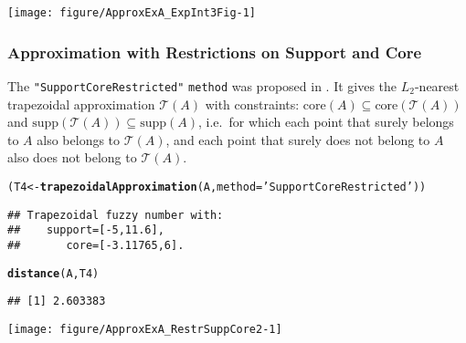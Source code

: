 \documentclass[11pt]{article}\usepackage[]{graphicx}\usepackage[]{color}
\makeatletter
\newcommand{\hlstr}[1]{\textcolor[rgb]{0.192,0.494,0.8}{#1}}%
\newcommand{\hlstd}[1]{\textcolor[rgb]{0.345,0.345,0.345}{#1}}%
\newcommand{\hlkwb}[1]{\textcolor[rgb]{0.69,0.353,0.396}{#1}}%
\newcommand{\hlkwc}[1]{\textcolor[rgb]{0.333,0.667,0.333}{#1}}%
\newcommand{\hlkwd}[1]{\textcolor[rgb]{0.737,0.353,0.396}{\textbf{#1}}}%
\newenvironment{kframe}{%
 \def\at@end@of@kframe{}%
 \ifinner\ifhmode%
  \def\at@end@of@kframe{\end{minipage}}%
  \begin{minipage}{\columnwidth}%
 \fi\fi%
 \def\FrameCommand##1{\hskip\@totalleftmargin \hskip-\fboxsep
 \colorbox{shadecolor}{##1}\hskip-\fboxsep
     \hskip-\linewidth \hskip-\@totalleftmargin \hskip\columnwidth}%
 \MakeFramed {\advance\hsize-\width
   \@totalleftmargin\z@ \linewidth\hsize
   \@setminipage}}%
 {\par\unskip\endMakeFramed%
 \at@end@of@kframe}
\newenvironment{knitrout}{}{} %
\newcommand{\argument}[1]{\texttt{\hlkwc{#1}}}
\newcommand{\str}[1]{\texttt{\hlstr{#1}}}
\makeatother
\begin{document}
\begin{center}
\begin{knitrout}\small
{}\color{fgcolor}

{\centering \texttt{[image: figure/ApproxExA\_ExpInt3Fig-1]} 

}



\end{knitrout}
\end{center}


\subsubsection{Approximation with Restrictions on Support and Core}


The \str{"{}SupportCoreRestricted"{}} \argument{method}
was proposed in \cite{GrzegorzewskiPasternak2011:trapapproxsupcore}.
It gives the $L_2$-nearest trapezoidal approximation $\mathcal{T}(A)$
with constraints:
$\mathrm{core}(A) \subseteq \mathrm{core}(\mathcal{T}(A))$
and $\mathrm{supp}(\mathcal{T}(A)) \subseteq \mathrm{supp}(A)$,
i.e.~for which each point that surely belongs to $A$ also belongs to $\mathcal{T}(A)$,
and each point that surely does not belong to $A$ also does not belong to $\mathcal{T}(A)$.

\begin{knitrout}\small
{}\color{fgcolor}\begin{kframe}
\begin{alltt}
\hlstd{(T4} \hlkwb{<-} \hlkwd{trapezoidalApproximation}\hlstd{(A,} \hlkwc{method}\hlstd{=}\hlstr{'SupportCoreRestricted'}\hlstd{))}
\end{alltt}
\begin{verbatim}
## Trapezoidal fuzzy number with:
##    support=[-5,11.6],
##       core=[-3.11765,6].
\end{verbatim}
\begin{alltt}
\hlkwd{distance}\hlstd{(A, T4)}
\end{alltt}
\begin{verbatim}
## [1] 2.603383
\end{verbatim}
\end{kframe}
\end{knitrout}

\begin{center}
\begin{knitrout}\small
{}\color{fgcolor}

{\centering \texttt{[image: figure/ApproxExA\_RestrSuppCore2-1]} 

}



\end{knitrout}
\end{center}
\end{document}
